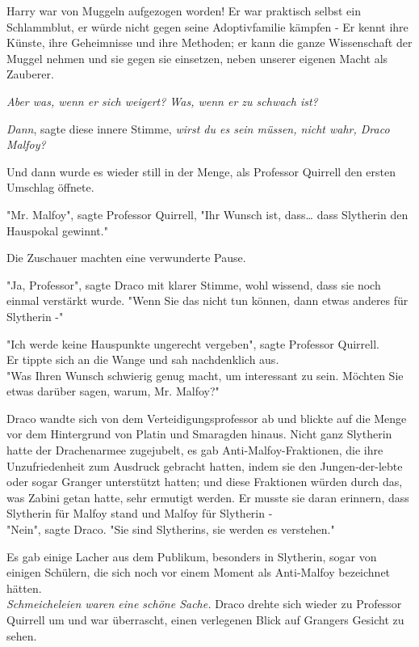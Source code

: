 {Harry war von Muggeln aufgezogen worden! Er war praktisch selbst ein Schlammblut, er würde nicht gegen seine Adoptivfamilie kämpfen - Er kennt ihre Künste, ihre Geheimnisse und ihre Methoden; er kann die ganze Wissenschaft der Muggel nehmen und sie gegen sie einsetzen, neben unserer eigenen Macht als Zauberer.

\emph{Aber was, wenn er sich weigert? Was, wenn er zu schwach ist?}

\emph{Dann}, sagte diese innere Stimme, \emph{wirst du es sein müssen, nicht wahr, Draco Malfoy?}

Und dann wurde es wieder still in der Menge, als Professor Quirrell den ersten Umschlag öffnete.

"Mr. Malfoy", sagte Professor Quirrell, "Ihr Wunsch ist, dass… dass Slytherin den Hauspokal gewinnt."

Die Zuschauer machten eine verwunderte Pause.

"Ja, Professor", sagte Draco mit klarer Stimme, wohl wissend, dass sie noch einmal verstärkt wurde. "Wenn Sie das nicht tun können, dann etwas anderes für Slytherin -"

"Ich werde keine Hauspunkte ungerecht vergeben", sagte Professor Quirrell.\\ Er tippte sich an die Wange und sah nachdenklich aus.\\ "Was Ihren Wunsch schwierig genug macht, um interessant zu sein. Möchten Sie etwas darüber sagen, warum, Mr. Malfoy?"

Draco wandte sich von dem Verteidigungsprofessor ab und blickte auf die Menge vor dem Hintergrund von Platin und Smaragden hinaus. Nicht ganz Slytherin hatte der Drachenarmee zugejubelt, es gab Anti-Malfoy-Fraktionen, die ihre Unzufriedenheit zum Ausdruck gebracht hatten, indem sie den Jungen-der-lebte oder sogar Granger unterstützt hatten; und diese Fraktionen würden durch das, was Zabini getan hatte, sehr ermutigt werden. Er musste sie daran erinnern, dass Slytherin für Malfoy stand und Malfoy für Slytherin -\\ "Nein", sagte Draco. "Sie sind Slytherins, sie werden es verstehen."

Es gab einige Lacher aus dem Publikum, besonders in Slytherin, sogar von einigen Schülern, die sich noch vor einem Moment als Anti-Malfoy bezeichnet hätten.\\ \emph{Schmeicheleien waren eine schöne Sache.} Draco drehte sich wieder zu Professor Quirrell um und war überrascht, einen verlegenen Blick auf Grangers Gesicht zu sehen.

}
